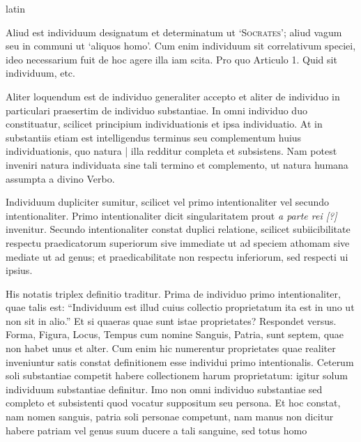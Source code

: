 \begin{otherlanguage*}{latin}
\pstart
{}
\pend

\pstart
Aliud est individuum designatum et determinatum ut \textsc{`Socrates'}; aliud vagum seu in communi ut `aliquos homo'. Cum enim individuum sit correlativum speciei, ideo necessarium fuit de hoc agere illa iam scita. Pro quo Articulo 1. Quid sit individuum, etc. 
\pend

\pstart
{}
\pend

\pstart
Aliter loquendum est de individuo generaliter accepto et aliter de individuo in particulari praesertim de individuo substantiae. In omni individuo duo constituatur, scilicet principium individuationis et ipsa individuatio. At in substantiis etiam est intelligendus terminus seu complementum huius individuationis, quo natura \textnormal{|} illa redditur completa et subsistens. Nam potest inveniri natura individuata sine tali termino et complemento, ut natura humana assumpta a divino Verbo. 
\pend

\pstart
Individuum dupliciter sumitur, scilicet vel primo intentionaliter vel secundo intentionaliter. Primo intentionaliter dicit singularitatem prout \emph{a parte rei [?]} invenitur. Secundo intentionaliter constat duplici relatione, scilicet subiicibilitate respectu praedicatorum superiorum sive immediate ut ad speciem athomam sive mediate ut ad genus; et praedicabilitate non respectu inferiorum, sed respecti ui ipsius. 
\pend

\pstart
His notatis triplex definitio traditur. Prima de individuo primo intentionaliter, quae talis est:
\enquote{Individuum est illud cuius collectio proprietatum ita est in uno ut non sit in alio.} Et si quaeras quae sunt istae proprietates? Respondet versus. Forma, Figura, Locus, Tempus cum nomine Sanguis, Patria, sunt septem, quae non habet unus et alter. Cum enim hic numerentur proprietates quae realiter inveniuntur satis constat definitionem esse individui primo intentionalis. Ceterum soli substantiae competit habere collectionem harum proprietatum:
igitur solum individuum substantiae definitur. Imo non omni individuo substantiae sed completo et subsistenti quod vocatur suppositum seu persona. Et hoc constat, nam nomen sanguis, patria soli personae competunt, nam manus non dicitur habere patriam vel genus suum ducere a tali sanguine, sed totus homo 
\pend


\end{otherlanguage*}
